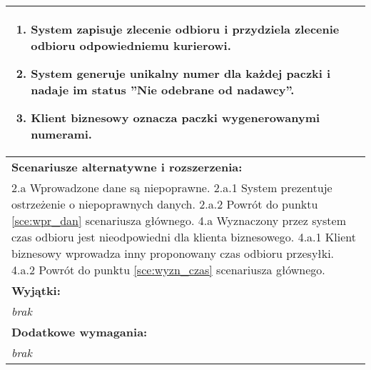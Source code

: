 \begin{center}
\begin{longtable}[h]{|p{1.6cm}|p{13.5cm}|}
{\begin{enumerate}
\item System zapisuje zlecenie odbioru i przydziela zlecenie odbioru odpowiedniemu kurierowi.
\item System generuje unikalny numer dla każdej paczki i nadaje im status ''Nie odebrane od nadawcy''.
\item Klient biznesowy oznacza paczki wygenerowanymi numerami.
\end{enumerate}
} \\ \hline
\multicolumn{2}{|p{15.1cm}|}{\textbf{Scenariusze alternatywne i rozszerzenia:}} \\
\multicolumn{2}{|p{15.1cm}|}{
2.a Wprowadzone dane są niepoprawne. \newline
2.a.1 System prezentuje ostrzeżenie o niepoprawnych danych. \newline
2.a.2 Powrót do punktu \ref{sce:wpr_dan} scenariusza głównego. \newline
\newline
4.a Wyznaczony przez system czas odbioru jest nieodpowiedni dla klienta biznesowego. \newline
4.a.1 Klient biznesowy wprowadza inny proponowany czas odbioru przesyłki. \newline
4.a.2 Powrót do punktu \ref{sce:wyzn_czas} scenariusza głównego.
} 
\\ \hline
\multicolumn{2}{|p{15.1cm}|}{\textbf{Wyjątki:}} \\
\multicolumn{2}{|p{15.1cm}|}{
\textit{brak}
} \\ \hline
\multicolumn{2}{|p{15.1cm}|}{\textbf{Dodatkowe wymagania:}} \\
\multicolumn{2}{|p{15.1cm}|}{\textit{brak}
} \\
\hline
\end{longtable}
\end{center}

